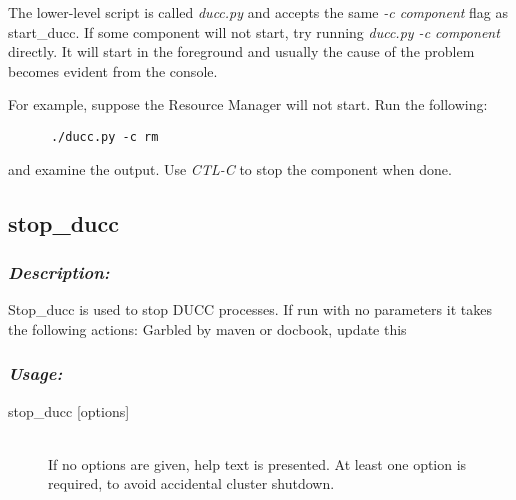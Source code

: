       The lower-level script is called {\em ducc.py} and accepts the same {\em -c component} flag as
      start\_ducc.  If some component will not start, try running {\em ducc.py -c component} directly.
      It will start in the foreground and usually the cause of the problem becomes evident from
      the console.

      For example, suppose the Resource Manager will not start.  Run the following:
\begin{verbatim}
      ./ducc.py -c rm
\end{verbatim}
      and examine the output.  Use {\em CTL-C} to stop the component when done.
      

\subsection{stop\_ducc}
\label{subsec:admin.stop-ducc}

    \subsubsection{{\em Description:}}
    Stop\_ducc is used to stop DUCC processes. If run with no parameters it takes the following 
    actions:
    \todo Garbled by maven or docbook, update this

    \subsubsection{\em Usage:}

    \begin{description}
      \item[stop\_ducc {[options]}] \hfill \\ 
        If no options are given, help text is presented. At least one option is required, to avoid 
        accidental cluster shutdown. 
      \end{description}
    

